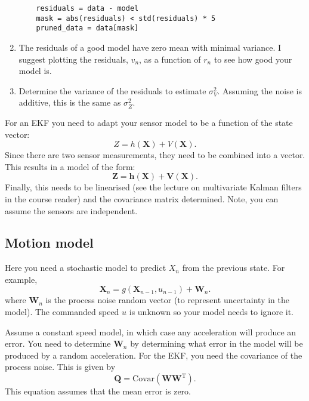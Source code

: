 \documentclass[a4paper, 12pt]{article}
\newcommand{\var}[1]{\sigma_{#1}^2}
\newcommand{\vh}{\mathbf{h}}
\newcommand{\vX}{\mathbf{X}}
\newcommand{\vV}{\mathbf{V}}
\newcommand{\vW}{\mathbf{W}}
\newcommand{\vZ}{\mathbf{Z}}
\begin{document}
\begin{enumerate}
  \begin{verbatim}
    residuals = data - model
    mask = abs(residuals) < std(residuals) * 5
    pruned_data = data[mask]
  \end{verbatim}

  \item The residuals of a good model have zero mean with minimal
    variance.  I suggest plotting the residuals, $v_n$, as a function of
    $r_n$ to see how good your model is.

  \item Determine the variance of the residuals to estimate $\var{V}$.
    Assuming the noise is additive, this is the same as $\var{Z}$.

\end{enumerate}

For an EKF you need to adapt your sensor model to be a function of
the state vector:
%
\begin{equation}
  Z = h(\vX) + V(\vX).
\end{equation}
%
Since there are two sensor measurements, they need to be combined into
a vector.  This results in a model of the form:
%
\begin{equation}
  \vZ = \vh(\vX) + \vV(\vX).
\end{equation}
%
Finally, this needs to be linearised (see the lecture on multivariate
Kalman filters in the course reader) and the covariance matrix
determined.  Note, you can assume the sensors are independent.


\subsection{Motion model}

Here you need a stochastic model to predict $X_n$ from the previous
state.  For example,
%
\begin{equation}
  \vX_n = g(\vX_{n-1}, u_{n-1}) + \vW_n.
\end{equation}
%
where $\vW_n$ is the process noise random vector (to represent
uncertainty in the model).  The commanded speed $u$ is unknown so your
model needs to ignore it.

Assume a constant speed model, in which case any acceleration will
produce an error.  You need to determine $\vW_n$ by determining
what error in the model will be produced by a random acceleration.
For the EKF, you need the covariance of the process noise.  This is
given by
%
\begin{equation}
  \mathbf{Q}  = \mathrm{Covar}(\mathbf{W} \mathbf{W}^{\mathrm{T}}).
\end{equation}
%
This equation assumes that the mean error is zero.
\end{document}
